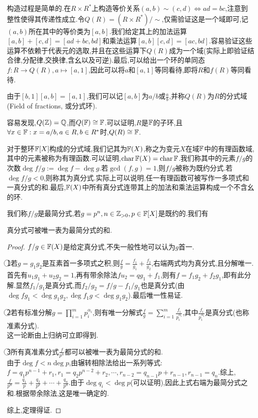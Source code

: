 \documentclass[openany]{book}
\begin{document}
构造过程是简单的.在$R\times R^*$上构造等价关系$(a,b)\sim (c,d)\iff ad=bc$,注意到整性使得其传递性成立.令$Q(R)=(R\times R^*)/\sim$,仅需验证这是一个域即可,记$(a,b)$所在其中的等价类为$[a,b]$.我们给定其上的加法运算$[a,b]+[c,d]=[ad+bc,bd]$和乘法运算$[a,b][c,d]=[ac,bd]$.容易验证这些运算不依赖于代表元的选取,并且在这些运算下$Q(R)$成为一个域(实际上即验证结合律,分配律,交换律,含幺以及可逆).最后,可以给出一个环的单同态$f:R\to Q(R), a\mapsto [a,1]$,因此可以将$a$和$[a,1]$等同看待,即将$R$和$f(R)$等同看待.

由于$[b,1][a,b]=[a,1]$,我们可以记$[a,b]$为$a/b$或$\frac{a}{b}$,并称$Q(R)$为$R$的分式域(Field of fractions, 或分式环).

容易发现,$Q(\mathbb{Z})=\mathbb{Q}$,而$Q(\mathbb{F})\cong \mathbb{F}$.可以证明,$R$是$\mathbb{F}$的子环,且$\forall x\in \mathbb{F}:x=a/b, a\in R, b\in R^*$时,$Q(R)\cong \mathbb{F}$.

对于整环$\mathbb{F}[X]$构成的分式域,我们记其为$\mathbb{F}(X)$,称之为变元$X$在域$\mathbb{F}$中的有理函数域,其中的元素被称为有理函数.可以证明,$\operatorname{char} \mathbb{F}(X)=\operatorname{char} \mathbb{F}$.我们称其中的元素$f/g$的次数$\deg f/g:=\deg f-\deg g$.若$\gcd(f,g)=1$,则$f/g$被称为既约分式.若$\deg f/g<0$,则称其为真分式.实际上可以说明,任一有理函数可被写作一多项式和一真分式的和.最后,$\mathbb{F}(X)$中所有真分式连带其上的加法和乘法运算构成一个不含幺的环.

我们称$f/g$是最简分式,若$g=p^n, n\in \mathbb{Z}_{>0}, p\in \mathbb{F}[X]$是既约的.我们有
\begin{theorem}
    真分式可被唯一表为最简分式的和.
\end{theorem}
\begin{proof}
    $f/g\in \mathbb{F}(X)$是给定真分式,不失一般性地可以认为$g$首一.

    \textcircled{1}若$g=g_1g_2$是互素首一多项式之积,则$\frac{f}{g}=\frac{f_1}{g_1}+\frac{f_2}{g_2}$,右端两式均为真分式,且分解唯一.\\
    首先有$u_1g_1+u_2g_2=1$,再有带余除法$fu_2=qg_1+f_1$,则有$f=f_1g_2+f_2g_1$,即有此分解.显然$f_1/g_1$是真分式,而$f_2/g_2=f/g-f_1/g_1$也是真分式(由$\deg fg_1<\deg g_1g_2, \deg f_1g<\deg g_1g_2$).最后唯一性易证.

    \textcircled{2}若有标准分解$g=\prod_{i=1}^m p_i^{\alpha_i}$,则有唯一分解式$\frac{f}{g}=\sum_{i=1}^m\frac{f_i}{p_i^{\alpha_i}}$,其中$\frac{f_i}{p_i^{\alpha_i}}$是真分式(也称准素分式).\\
    这一论断由上归纳可立即得到.

    \textcircled{3}所有真准素分式$\frac{f}{p^n}$都可以被唯一表为最简分式的和.\\
    由于$\deg f<n \deg p$,由辗转相除法给出一系列等式:$f=q_1p^{n-1}+r_1, r_1=q_2p^{n-2}+r_2,\cdots, r_{n-2}=q_{n-1}p+r_{n-1}, r_{n-1}=q_n$.综上,$\frac{f}{p^n}=\frac{q_1}{p}+\frac{q_2}{p^{2}}+\cdots+\frac{q_n}{p^n}$.由于$\deg q_i<\deg p$(可以证明),因此上式右端为最简分式之和.根据带余除法,这是唯一确定的.

    综上,定理得证.
\end{proof}
\end{document}

